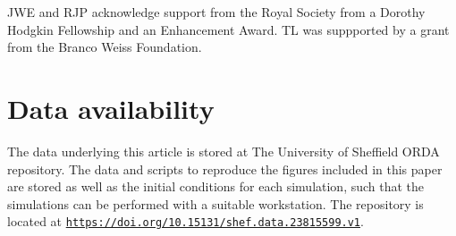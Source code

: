 \documentclass[fleqn,usenatbib]{mnras}
\newcommand{\weblink}[1]{\texttt{\href{#1}{#1}}}
\begin{document}
JWE and RJP acknowledge support from the Royal Society from a Dorothy Hodgkin Fellowship and an Enhancement Award. TL was suppported by a grant from the Branco Weiss Foundation.

\section*{Data availability}

The data underlying this article is stored at The University of Sheffield ORDA repository.
The data and scripts to reproduce the figures included in this paper are stored as well as the initial conditions for each simulation, such that the simulations can be performed with a suitable workstation.
The repository is located at
\weblink{https://doi.org/10.15131/shef.data.23815599.v1}.














\bsp	%
\label{lastpage}
\end{document}
